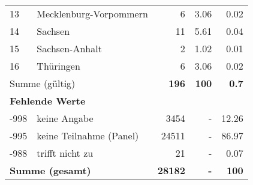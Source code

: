 \begin{longtable}{lXrrr}
     13 &
     \multicolumn{1}{X}{ Mecklenburg-Vorpommern   } &


       \num{6} &
       \num[round-mode=places,round-precision=2]{3.06} &
         \num[round-mode=places,round-precision=2]{0.02} \\

     14 &
     \multicolumn{1}{X}{ Sachsen   } &


       \num{11} &
       \num[round-mode=places,round-precision=2]{5.61} &
         \num[round-mode=places,round-precision=2]{0.04} \\

     15 &
     \multicolumn{1}{X}{ Sachsen-Anhalt   } &


       \num{2} &
       \num[round-mode=places,round-precision=2]{1.02} &
         \num[round-mode=places,round-precision=2]{0.01} \\

     16 &
     \multicolumn{1}{X}{ Thüringen   } &


       \num{6} &
       \num[round-mode=places,round-precision=2]{3.06} &
         \num[round-mode=places,round-precision=2]{0.02} \\
     \midrule
     \multicolumn{2}{l}{Summe (gültig)} &
       \textbf{\num{196}} &
     \textbf{\num{100}} &
       \textbf{\num[round-mode=places,round-precision=2]{0.7}} \\
     \multicolumn{5}{l}{\textbf{Fehlende Werte}}\\
       -998 &
       keine Angabe &
         \num{3454} &
        - &
         \num[round-mode=places,round-precision=2]{12.26} \\
       -995 &
       keine Teilnahme (Panel) &
         \num{24511} &
        - &
         \num[round-mode=places,round-precision=2]{86.97} \\
       -988 &
       trifft nicht zu &
         \num{21} &
        - &
         \num[round-mode=places,round-precision=2]{0.07} \\
     \midrule
     \multicolumn{2}{l}{\textbf{Summe (gesamt)}} &
          \textbf{\num{28182}} &
        \textbf{-} &
        \textbf{\num{100}} \\
     \bottomrule
     \end{longtable}
     
